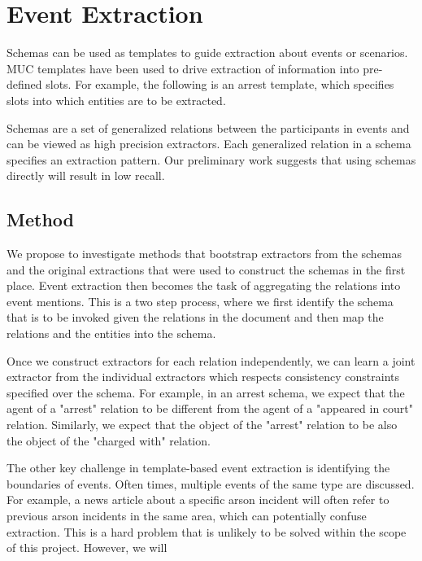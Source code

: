 \section{Event Extraction}

Schemas can be used as templates to guide extraction about events or scenarios. MUC templates have been used to drive extraction of information into pre-defined slots. For example, the following is an arrest template, which specifies slots into which entities are to be extracted.

Schemas are a set of generalized relations between the participants in events and can be viewed as high precision extractors. Each generalized relation in a schema specifies an extraction pattern. Our preliminary work suggests that using schemas directly will result in low recall. 

\subsection{Method}
We propose to investigate methods that bootstrap extractors from the schemas and the original extractions that were used to construct the schemas in the first place. Event extraction then becomes the task of aggregating the relations into event mentions. This is a two step process, where we first identify the schema that is to be invoked given the relations in the document and then map the relations and the entities into the schema. 

Once we construct extractors for each relation independently, we can learn a joint extractor from the individual extractors which respects consistency constraints specified over the schema. For example, in an arrest schema, we expect that the agent of a "arrest" relation to be different from the agent of a "appeared in court" relation. Similarly, we expect that the object of the "arrest" relation to be also the object of the "charged with" relation. 


The other key challenge in template-based event extraction is identifying the boundaries of events. Often times, multiple events of the same type are discussed. For example, a news article about a specific arson incident will often refer to previous arson incidents in the same area, which can potentially confuse extraction. This is a hard problem that is unlikely to be solved within the scope of this project. However, we will 



